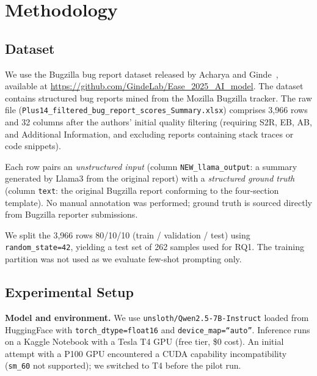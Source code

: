 
\section{Methodology}
\label{sec:method}

\subsection{Dataset}
\label{sec:dataset}

We use the Bugzilla bug report dataset released by Acharya and
Ginde~\cite{acharya2025bugquality}, available at
\url{https://github.com/GindeLab/Ease_2025_AI_model}. The
dataset contains structured bug reports mined from the Mozilla
Bugzilla tracker. The raw file
(\texttt{Plus14\_filtered\_bug\_report\_scores\_Summary.xlsx})
comprises 3,966 rows and 32 columns after the authors' initial
quality filtering (requiring S2R, EB, AB, and Additional
Information, and excluding reports containing stack traces or
code snippets).

Each row pairs an \emph{unstructured input} (column
\texttt{NEW\_llama\_output}: a summary generated by Llama3
from the original report) with a \emph{structured ground truth}
(column \texttt{text}: the original Bugzilla report conforming
to the four-section template). No manual annotation was
performed; ground truth is sourced directly from Bugzilla
reporter submissions.

We split the 3,966 rows 80/10/10 (train / validation / test)
using \texttt{random\_state=42}, yielding a test set of 262
samples used for RQ1. The training partition was not used as
we evaluate few-shot prompting only.

\subsection{Experimental Setup}
\label{sec:setup}

\textbf{Model and environment.}
We use \texttt{unsloth/Qwen2.5-7B-Instruct} loaded from
HuggingFace with \texttt{torch\_dtype=float16} and
\texttt{device\_map=``auto''}. Inference runs on a Kaggle
Notebook with a Tesla T4 GPU (free tier, \$0 cost). An
initial attempt with a P100 GPU encountered a CUDA capability
incompatibility (\texttt{sm\_60} not supported); we switched
to T4 before the pilot run.

